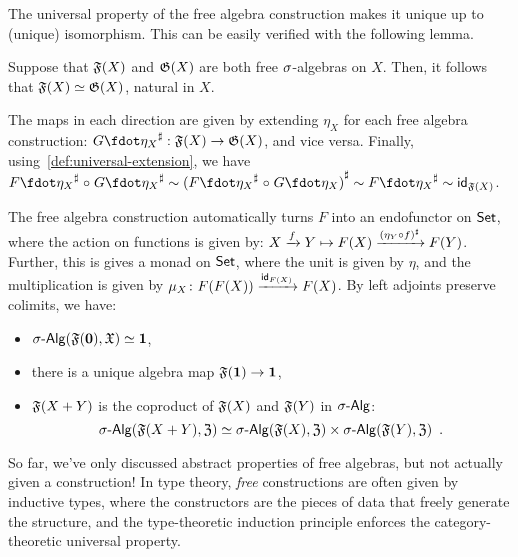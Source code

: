 The universal property of the free algebra construction makes it unique up to (unique) isomorphism.
%
This can be easily verified with the following lemma.
\begin{lemma}
    \label{lem:free-algebras-unique}
    Suppose that $\mathfrak{F}(X)$ and $\mathfrak{G}(X)$ are both free $\sigma$-algebras on $X$.
    Then, it follows that $\mathfrak{F}(X) \mathrel{\simeq} \mathfrak{G}(X)$, natural in $X$.
\end{lemma}
\begin{proofsketch}
    The maps in each direction are given by extending $\eta_X$ for each free algebra construction:
    $\ext{G\fdot\eta_{X}} : \str{F}(X) \to \str{G}(X)$, and vice versa.
    Finally, using~\cref{def:universal-extension}, we have
    \(
    \ext{F\fdot\eta_{X}} \comp \ext{G\fdot\eta_{X}} \htpy
    \ext{(\ext{F\fdot\eta_{X}} \comp G\fdot\eta_{X})} \htpy
    \ext{F\fdot\eta_{X}} \htpy
    \idfunc_{\str{F}(X)}
    \).
\end{proofsketch}
The free algebra construction automatically turns $F$ into an endofunctor on $\mathsf{Set}$,
where the action on functions is given by:
$X \xrightarrow{f} Y \mapsto F(X) \xrightarrow{{(\eta_{Y} \mathrel{\circ} f)}^{\sharp}} F(Y)$.
%
Further, this is gives a monad on $\mathsf{Set}$, where the unit is given by $\eta$,
and the multiplication is given by $\mu_{X}\colon F(F(X)) \xrightarrow{\operatorname{\mathsf{id}}_{F(X)}} F(X)$.
%
By left adjoints preserve colimits, we have:
\begin{proposition}
    \label{prop:free-algebra-colimits}
    \leavevmode
    \begin{itemize}
        \item $\sigAlg(\str{F}(\emptyt), \str{X}) \eqv \unitt$,
        \item there is a unique algebra map $\mathfrak{F}({\mathbf{1}}) \to {\mathbf{1}}$,
        \item $\mathfrak{F}(X + Y)$ is the coproduct of $\mathfrak{F}(X)$ and $\mathfrak{F}(Y)$ in $\sigAlg$:
              \[
                  \sigAlg(\str{F}(X + Y), \str{Z}) \eqv
                  \sigAlg(\str{F}(X), \str{Z}) \times \sigAlg(\str{F}(Y), \str{Z})
                  \enspace.
              \]
    \end{itemize}
\end{proposition}

So far, we've only discussed abstract properties of free algebras, but not actually given a construction!
%
In type theory, \emph{free} constructions are often given by inductive types,
where the constructors are the pieces of data that freely generate the structure,
and the type-theoretic induction principle enforces the category-theoretic universal property.

